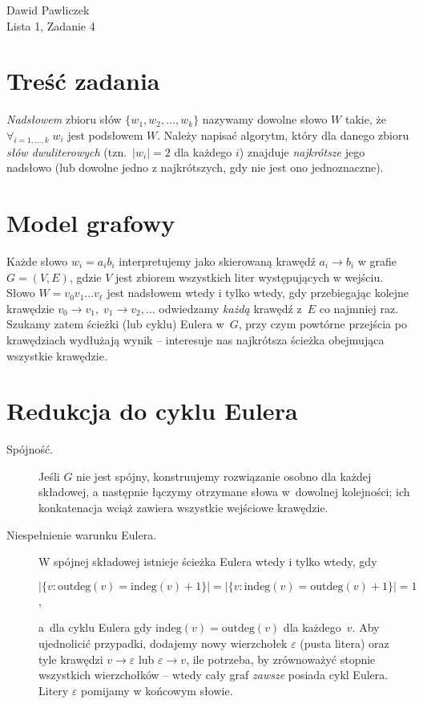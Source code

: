 \documentclass[11pt,a4paper]{article}
\begin{document}
\begin{center}
\Large Dawid Pawliczek\\
Lista 1, Zadanie 4
\end{center}

\bigskip

\section*{Treść zadania}

\noindent
\emph{Nadsłowem} zbioru słów $\{w_1,w_2,\dots,w_k\}$ nazywamy dowolne
słowo $W$ takie, że
\(
  \forall_{i=1,\dots,k}\; w_i
\)
jest pod­słowem $W$.
Należy napisać algorytm, który dla danego zbioru \emph{słów
dwuliterowych} (tzn.\ $|w_i|=2$ dla każdego $i$) znajduje
\emph{najkrótsze} jego nadsłowo
(lub dowolne jedno z najkrótszych, gdy nie jest ono jednoznaczne).

\section*{Model grafowy}

Każde słowo $w_i=a_ib_i$ interpre­tujemy jako skierowaną krawędź
$a_i\!\to b_i$ w grafie $G=(V,E)$, gdzie $V$ jest zbiorem wszystkich
liter występujących w wejściu.
Słowo $W=v_0v_1\dots v_\ell$ jest nadsłowem wtedy
i tylko wtedy, gdy przebiegając kolejne krawędzie
$v_0\!\to v_1,\;v_1\!\to v_2,\dots$
odwiedzamy \emph{każdą} krawędź z~$E$
co najmniej raz.
Szukamy zatem ścieżki (lub cyklu) Eulera w~$G$,
przy czym powtórne przejścia po krawędziach wydłużają wynik
– interesuje nas najkrótsza ścieżka obejmująca wszystkie krawędzie.

\section*{Redukcja do cyklu Eulera}

\begin{description}
  \item[Spójność.]
        Jeśli $G$ nie jest spójny, konstruujemy rozwiązanie osobno
        dla każdej składowej, a następnie łączymy otrzymane słowa
        w~dowolnej kolejności; ich konkatenacja wciąż zawiera wszystkie
        wejściowe krawędzie.
  \item[Niespełnienie warunku Eulera.]
        W spójnej składowej
        istnieje ścieżka Eulera
        wtedy i tylko wtedy, gdy \\
        \centerline{$\bigl|\{v: \text{outdeg}(v)=\text{indeg}(v)+1\}\bigr|=%
                   \bigl|\{v: \text{indeg}(v)=\text{outdeg}(v)+1\}\bigr|=1$,}
        a~dla cyklu Eulera gdy
        $\text{indeg}(v)=\text{outdeg}(v)$ dla każdego~$v$.
        Aby ujednolicić przypadki,
        dodajemy nowy wierzchołek $\varepsilon$ (pusta litera)
        oraz tyle krawędzi $v\!\to\varepsilon$ lub $\varepsilon\!\to v$,
        ile potrzeba, by zrównoważyć stopnie wszystkich
        wierzchołków – wtedy cały graf \emph{zawsze} posiada
        cykl Eulera.  Litery $\varepsilon$ pomijamy w końcowym słowie.
\end{description}
\end{document}
